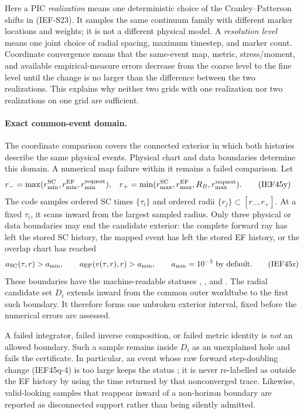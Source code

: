 Here a PIC \emph{realization} means one deterministic choice of the
Cranley--Patterson shifts in (IEF-S23).  It samples the same continuum family
with different marker locations and weights; it is not a different physical
model.  A \emph{resolution level} means one joint choice of radial spacing,
maximum timestep, and marker count.  Coordinate convergence means that the
same-event map, metric, stress/moment, and available empirical-measure errors
decrease from the coarse level to the fine level until the change is no
larger than the difference between the two realizations.  This explains why
neither two grids with one realization nor two realizations on one grid are
sufficient.

\paragraph{Exact common-event domain.}
The coordinate comparison covers the connected exterior in which both
histories describe the same physical events.  Physical chart and data
boundaries determine this domain.  A numerical map failure within it remains
a failed comparison.  Let
\begin{align}
 r_-&=\max(r_{\min}^{\rm SC},r_{\min}^{\rm EF},r_{\min}^{\rm request}),&
 r_+&=\min(r_{\max}^{\rm SC},r_{\max}^{\rm EF},R_B,
           r_{\max}^{\rm request}).                    \tag{IEF45y}
\end{align}
The code samples ordered SC times \(\{\tau_i\}\) and ordered radii
\(\{r_j\}\subset[r_-,r_+]\).  At a fixed \(\tau_i\), it scans inward from the
largest sampled radius.  Only three physical or data boundaries may end the
candidate exterior: the complete forward ray has left the stored SC history,
the mapped event has left the stored EF history, or the overlap chart has
reached
\[
 a_{\rm SC}(\tau,r)>a_{\min},\qquad
 a_{\rm EF}(v(\tau,r),r)>a_{\min},\qquad
 a_{\min}=10^{-3}\ \hbox{by default}.                  \tag{IEF45z}
\]
These boundaries have the machine-readable statuses
, , and
.  The radial candidate set \(D_i\) extends inward from the common outer
worldtube to the first such boundary.  It therefore forms one unbroken
exterior interval, fixed before the numerical errors are assessed.

A failed integrator, failed inverse composition, or failed metric identity is
\emph{not} an allowed boundary.  Such a sample remains inside \(D_i\) as an
unexplained hole and fails the certificate.  In particular, an event whose
raw forward step-doubling change (IEF45q-4) is too large keeps the status
; it is never re-labelled as outside the
EF history by using the time returned by that nonconverged trace.  Likewise,
valid-looking samples that reappear inward of a non-horizon boundary are
reported as disconnected support rather than being silently admitted.

